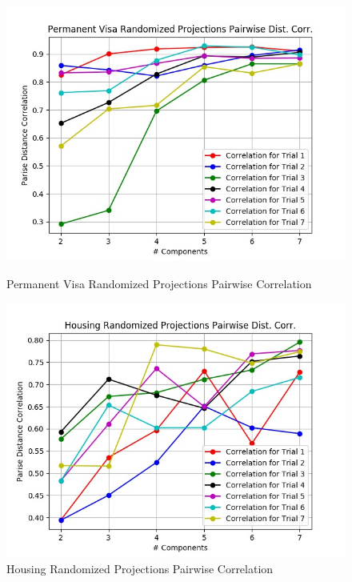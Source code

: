 \documentclass[h]{article}
\begin{document}
 \begin{figure}[H]
      \includegraphics[width=1\textwidth,keepaspectratio]{permanent_visa_randomized_projections_pairwise_distpt_corrpt.jpg} 
      \caption*{Permanent Visa Randomized Projections Pairwise Correlation } 
   \endminipage\hfill
      \includegraphics[width=1\textwidth,keepaspectratio]{housing_randomized_projections_pairwise_distpt_corrpt.jpg} 
      \caption*{Housing Randomized Projections Pairwise Correlation} 
   \endminipage\hfill
\end{figure}
\end{document}
